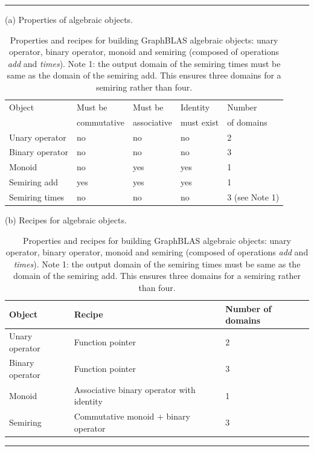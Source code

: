\begin{table}
	\hrule
	\begin{center}
		\caption{Properties and recipes for building GraphBLAS algebraic objects: unary operator, binary operator, monoid and semiring (composed of operations \emph{add} and \emph{times}).\newline
		\hspace{\textwidth}Note 1: the output domain of the semiring times must be same as the domain of the semiring add. This ensures three domains for a semiring rather than four.}
		\label{Tab:AlgebraicObjects}
		
		\vspace{1\baselineskip}
		(a) Properties of algebraic objects.
		\vspace{1\baselineskip}
		
		\begin{tabular}{l|l|l|l|l}
			Object 		& Must be  	& Must be  	& Identity 	& Number \\
			       		& commutative 	& associative 	& must exist 	& of domains  \\
            \hline
			Unary operator 	& no		& no		& no 		& 2 \\
			Binary operator & no		& no 		& no 		& 3  \\
			Monoid          & no		& yes 		& yes 		& 1  \\
			Semiring add 	& yes		& yes 		& yes  		& 1  \\
			Semiring times 	& no		& no 		& no 		& 3  (see Note 1) \\
		\end{tabular}
		
		\vspace{1\baselineskip}
		(b) Recipes for algebraic objects.
		\vspace{1\baselineskip}
		
		\begin{tabular}{l|l|l}
			Object          & Recipe                			            & Number of domains  \\ 
                        \hline
			Unary operator  & Function pointer      			            & 2 \\				
			Binary operator & Function pointer      			            & 3  \\	
			Monoid          & Associative binary operator with identity 	& 1  \\
			Semiring        & Commutative monoid $+$ binary operator 	    & 3 \\
		\end{tabular}
		
	\end{center}
	\hrule
\end{table}

